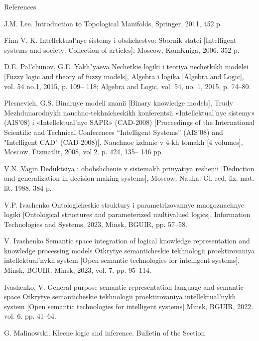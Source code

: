 \documentclass{article}
\begin{document}
\begin{multicols}{2}
\begin{center}
\large
References
\end{center}
\begin{enumerate}[label={[\arabic*]},itemsep=0pt, leftmargin=2em, labelsep=1em,topsep=0pt]
\footnotesize
\setlength{\parskip}{0pt}
\item J.M. Lee. Introduction to Topological Manifolds, Springer, 2011,
452 p.
\noindent\item Finn V. K. Intellektual’nye sistemy i obshchestvo: Sbornik statei
[Intelligent systems and society: Collection of articles], Moscow,
KomKniga, 2006. 352 p.
\noindent\item D.E. Pal’chunov, G.E. Yakh"yaeva Nechetkie logiki i teoriya
nechetkikh modelei [Fuzzy logic and theory of fuzzy models],
Algebra i logika [Algebra and Logic], vol. 54 no.1, 2015, p. 109–
118; Algebra and Logic, vol. 54, no. 1, 2015, p. 74–80.
\noindent\item Plesnevich, G.S. Binarnye modeli znanii [Binary knowledge
models], Trudy Mezhdunarodnykh nauchno-tekhnicheskikh konferentsii «Intellektual’nye sistemy» (AIS’08) i «Intellektual’nye
SAPR» (CAD-2008) [Proceedings of the International Scientific and Technical Conferences “Intelligent Systems” (AIS’08)
and "Intelligent CAD" (CAD-2008)]. Nauchnoe izdanie v 4-kh
tomakh [4 volumes], Moscow, Fizmatlit, 2008, vol.2. p. 424, 135–
146 pp.
\noindent \item V.N. Vagin Deduktsiya i obobshchenie v sistemakh prinyatiya
reshenii [Deduction and generalization in decision-making systems], Moscow, Nauka. Gl. red. fiz.-mat. lit. 1988. 384 p.
\noindent\item  V.P. Ivashenko Ontologicheskie struktury i parametrizovannye
mnogoznachnye logiki [Ontological structures and parameterized
multivalued logics], Information Technologies and Systems, 2023,
Minsk, BGUIR, pp. 57–58.
\noindent\item V. Ivashenko Semantic space integration of logical knowledge
representation and knowledge processing models Otkrytye semanticheskie tekhnologii proektirovaniya intellektual’nykh system [Open semantic technologies for intelligent systems], Minsk,
BGUIR. Minsk, 2023, vol. 7. pp. 95–114.
\noindent\item Ivashenko, V. General-purpose semantic representation language
and semantic space Otkrytye semanticheskie tekhnologii proektirovaniya intellektual’nykh system [Open semantic technologies
for intelligent systems] Minsk, BGUIR, 2022. vol. 6. pp. 41–64.
\noindent\item G. Malinowski, Kleene logic and inference. Bulletin of the Section

\end{enumerate}
\end{multicols}
\end{document}
